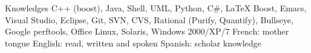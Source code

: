 






\begin{rubric}{Knowledges}
  C++ (boost), Java, Shell, UML, Python, C\#, \LaTeX
  \entry*[Tools]
  Boost, Emacs, Visual Studio, Eclipse, Git, SVN, CVS, Rational
  (Purify, Quantify), Bullseye, Google perftools, Office
  Linux, Solaris, Windows 2000/XP/7
  \entry*[Languages]
  French: mother tongue
  \entry*
  English: read, written and spoken
  \entry*
  Spanish: scholar knowledge
\end{rubric}
